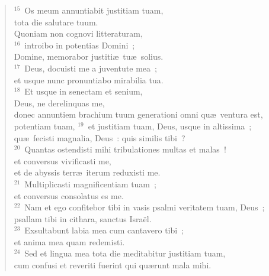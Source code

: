 \begin{verse}
${}^{15}$~Os meum annuntiabit justitiam tuam,\\ tota die salutare tuum.\\ Quoniam non cognovi litteraturam,\\
${}^{16}$~introibo in potentias Domini~;\\ Domine, memorabor justiti\ae\ tu\ae\ solius.\\
${}^{17}$~Deus, docuisti me a juventute mea~;\\ et usque nunc pronuntiabo mirabilia tua.\\
${}^{18}$~Et usque in senectam et senium,\\ Deus, ne derelinquas me,\\ donec annuntiem brachium tuum generationi omni qu\ae\ ventura est,\\ potentiam tuam,
${}^{19}$~et justitiam tuam, Deus, usque in altissima~;\\ qu\ae\ fecisti magnalia, Deus~: quis similis tibi~?\\
${}^{20}$~Quantas ostendisti mihi tribulationes multas et malas~!\\ et conversus vivificasti me,\\ et de abyssis terr\ae\ iterum reduxisti me.\\
${}^{21}$~Multiplicasti magnificentiam tuam~;\\ et conversus consolatus es me.\\
${}^{22}$~Nam et ego confitebor tibi in vasis psalmi veritatem tuam, Deus~;\\ psallam tibi in cithara, sanctus Isra\"el.\\
${}^{23}$~Exsultabunt labia mea cum cantavero tibi~;\\ et anima mea quam redemisti.\\
${}^{24}$~Sed et lingua mea tota die meditabitur justitiam tuam,\\ cum confusi et reveriti fuerint qui qu\ae runt mala mihi.\end{verse}



